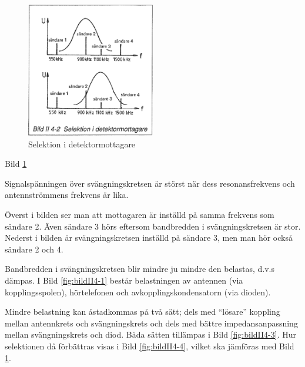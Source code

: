 \begin{figure}
  \includegraphics[width=0.5\textwidth]{images/bild_2_4-02}
  \caption{Selektion i detektormottagare}
  \label{fig:bildII4-2}
\end{figure}

Bild \ref{fig:bildII4-2}

Signalspänningen över svängningskretsen är störst när dess
resonansfrekvens och antennströmmens frekvens är lika.

Överst i bilden ser man att mottagaren är inställd på samma frekvens
som sändare 2.  Även sändare 3 hörs eftersom bandbredden i
svängningskretsen är stor. Nederst i bilden är svängningskretsen
inställd på sändare 3, men man hör också sändare 2 och 4.

Bandbredden i svängningskretsen blir mindre ju mindre den belastas,
d.v.s dämpas. I Bild \ref{fig:bildII4-1} består belastningen av antennen (via
kopplingsspolen), hörtelefonen och avkopplingskondensatorn (via
dioden).

Mindre belastning kan åstadkommas på två sätt; dels med ``lösare''
koppling mellan antennkrets och svängningskrets och dels med bättre
impedansanpassning mellan svängningskrets och diod. Båda sätten
tillämpas i Bild \ref{fig:bildII4-3}. Hur selektionen då förbättras visas i
Bild \ref{fig:bildII4-4}, vilket ska jämföras med Bild \ref{fig:bildII4-2}.

